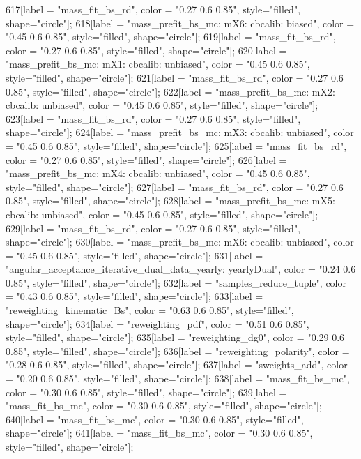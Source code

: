 {	617[label = "mass_fit_bs_rd", color = "0.27 0.6 0.85", style="filled", shape="circle"];
	618[label = "mass_prefit_bs_mc\nmassbin: mX6\nmassmodel: cbcalib\ntrigger: biased", color = "0.45 0.6 0.85", style="filled", shape="circle"];
	619[label = "mass_fit_bs_rd", color = "0.27 0.6 0.85", style="filled", shape="circle"];
	620[label = "mass_prefit_bs_mc\nmassbin: mX1\nmassmodel: cbcalib\ntrigger: unbiased", color = "0.45 0.6 0.85", style="filled", shape="circle"];
	621[label = "mass_fit_bs_rd", color = "0.27 0.6 0.85", style="filled", shape="circle"];
	622[label = "mass_prefit_bs_mc\nmassbin: mX2\nmassmodel: cbcalib\ntrigger: unbiased", color = "0.45 0.6 0.85", style="filled", shape="circle"];
	623[label = "mass_fit_bs_rd", color = "0.27 0.6 0.85", style="filled", shape="circle"];
	624[label = "mass_prefit_bs_mc\nmassbin: mX3\nmassmodel: cbcalib\ntrigger: unbiased", color = "0.45 0.6 0.85", style="filled", shape="circle"];
	625[label = "mass_fit_bs_rd", color = "0.27 0.6 0.85", style="filled", shape="circle"];
	626[label = "mass_prefit_bs_mc\nmassbin: mX4\nmassmodel: cbcalib\ntrigger: unbiased", color = "0.45 0.6 0.85", style="filled", shape="circle"];
	627[label = "mass_fit_bs_rd", color = "0.27 0.6 0.85", style="filled", shape="circle"];
	628[label = "mass_prefit_bs_mc\nmassbin: mX5\nmassmodel: cbcalib\ntrigger: unbiased", color = "0.45 0.6 0.85", style="filled", shape="circle"];
	629[label = "mass_fit_bs_rd", color = "0.27 0.6 0.85", style="filled", shape="circle"];
	630[label = "mass_prefit_bs_mc\nmassbin: mX6\nmassmodel: cbcalib\ntrigger: unbiased", color = "0.45 0.6 0.85", style="filled", shape="circle"];
	631[label = "angular_acceptance_iterative_dual_data_yearly\nangacc: yearlyDual", color = "0.24 0.6 0.85", style="filled", shape="circle"];
	632[label = "samples_reduce_tuple", color = "0.43 0.6 0.85", style="filled", shape="circle"];
	633[label = "reweighting_kinematic_Bs", color = "0.63 0.6 0.85", style="filled", shape="circle"];
	634[label = "reweighting_pdf", color = "0.51 0.6 0.85", style="filled", shape="circle"];
	635[label = "reweighting_dg0", color = "0.29 0.6 0.85", style="filled", shape="circle"];
	636[label = "reweighting_polarity", color = "0.28 0.6 0.85", style="filled", shape="circle"];
	637[label = "sweights_add", color = "0.20 0.6 0.85", style="filled", shape="circle"];
	638[label = "mass_fit_bs_mc", color = "0.30 0.6 0.85", style="filled", shape="circle"];
	639[label = "mass_fit_bs_mc", color = "0.30 0.6 0.85", style="filled", shape="circle"];
	640[label = "mass_fit_bs_mc", color = "0.30 0.6 0.85", style="filled", shape="circle"];
	641[label = "mass_fit_bs_mc", color = "0.30 0.6 0.85", style="filled", shape="circle"];
}
